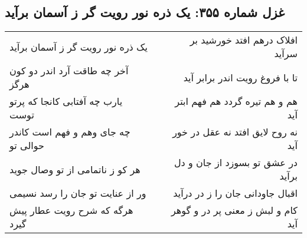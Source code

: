 \begin{center}
\section*{غزل شماره ۳۵۵: یک ذره نور رویت گر ز آسمان برآید}
\label{sec:355}
\begin{longtable}{l p{0.5cm} r}
یک ذره نور رویت گر ز آسمان برآید
&&
افلاک درهم افتد خورشید بر سرآید
\\
آخر چه طاقت آرد اندر دو کون هرگز
&&
تا با فروغ رویت اندر برابر آید
\\
یارب چه آفتابی کانجا که پرتو توست
&&
هم و هم تیره گردد هم فهم ابتر آید
\\
چه جای وهم و فهم است کاندر حوالی تو
&&
نه روح لایق افتد نه عقل در خور آید
\\
هر کو ز ناتمامی از تو وصال جوید
&&
در عشق تو بسوزد از جان و دل برآید
\\
ور از عنایت تو جان را رسد نسیمی
&&
اقبال جاودانی جان را ز در درآید
\\
هرگه که شرح رویت عطار پیش گیرد
&&
کام و لبش ز معنی پر در و گوهر آید
\\
\end{longtable}
\end{center}

